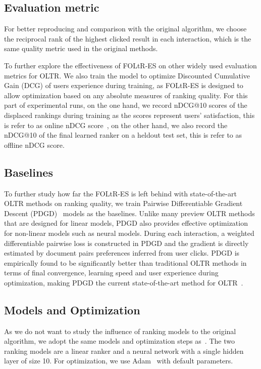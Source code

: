 \subsection{Evaluation metric}

For better reproducing and comparison with the original algorithm, we choose the reciprocal rank of the highest clicked result in each interaction, which is the same quality metric used in the original methods. 

To further explore the effectiveness of FOLtR-ES on other widely used evaluation metrics for OLTR. We also train the model to optimize Discounted Cumulative Gain (DCG) of users experience during training, as FOLtR-ES is designed to allow optimization based on any absolute measures of ranking quality. For this part of experimental runs, on the one hand, we record nDCG@10 scores of the displaced rankings during training as the scores represent users' satisfaction, this is refer to as online nDCG score~\cite{DBLP:conf/wsdm/HofmannSWR13}, on the other hand, we also record the nDCG@10 of the final learned ranker on a heldout test set, this is refer to as offline nDCG score.
\subsection{Baselines}

To further study how far the FOLtR-ES is left behind with state-of-the-art OLTR methods on ranking quality, we train Pairwise Differentiable Gradient Descent (PDGD)~\cite{oosterhuis2018differentiable} models as the baselines. Unlike many preview OLTR methods that are designed for linear models, PDGD also provides effective optimization for non-linear models such as neural models. During each interaction, a weighted differentiable pairwise loss is constructed in PDGD and the gradient is directly estimated by document pairs preferences inferred from user clicks. PDGD is empirically found to be significantly better than traditional OLTR methods in terms of final convergence, learning speed and user experience during optimization, making PDGD the current state-of-the-art method for OLTR~\cite{jagerman2019model,zhuang2020counterfactual}.
 
\subsection{Models and Optimization}
As we do not want to study the influence of ranking models to the original algorithm, we adopt the same models and optimization steps as~\cite{kharitonov2019federated}. The two ranking models are a linear ranker and a neural network with a single hidden layer of size 10. For optimization, we use Adam~\cite{kingma2014adam} with default parameters.

